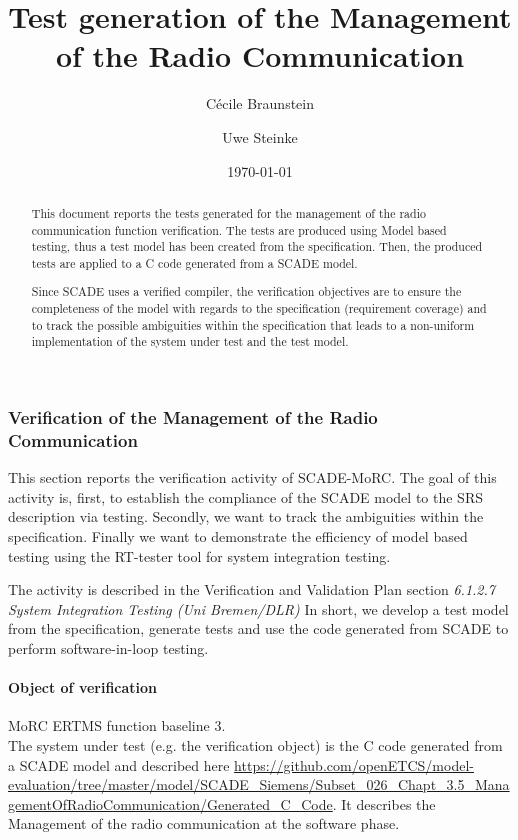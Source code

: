 \documentclass{article}
\title{Test generation of the Management of the Radio Communication}
\author{Cécile Braunstein \and Uwe Steinke}
\date{\today}
\newcommand{\nl}{\mbox{}\\}
\begin{document}
\maketitle
\begin{abstract}
  This document reports the tests generated for the management of the
  radio communication function verification.  The tests are produced
  using Model based testing, thus a test model has been created from
  the specification.  Then, the produced tests are applied to a C code
  generated from a SCADE model.

  Since SCADE uses a verified compiler, the verification objectives
  are to ensure the completeness of the model with regards to the
  specification (requirement coverage) and to track the possible
  ambiguities within the specification that leads to a non-uniform
  implementation of the system under test and the test model.
\end{abstract}


\subsubsection{Verification of the  Management of the Radio Communication}

This section reports the verification activity of SCADE-MoRC. The goal
of this activity is, first, to establish the compliance of the SCADE
model to the SRS description via testing. Secondly, we want to track
the ambiguities within the specification. Finally we want to
demonstrate the efficiency of model based testing using the RT-tester
tool for system integration testing.

The activity is described in the Verification and Validation Plan
section {\em 6.1.2.7 System Integration Testing (Uni Bremen/DLR)} \cite{D4.1_2013}
In short, we develop a test model from the specification, generate tests and use
the code generated from SCADE to perform software-in-loop testing.

\paragraph{Object of verification}
 MoRC ERTMS function baseline 3.
\nl


The system under test (e.g. the verification object) is the C code
generated from a SCADE model and described here
\url{https://github.com/openETCS/model-evaluation/tree/master/model/SCADE_Siemens/Subset_026_Chapt_3.5_ManagementOfRadioCommunication/Generated_C_Code}.
It describes the Management of the radio communication at the software
phase.
\end{document}

